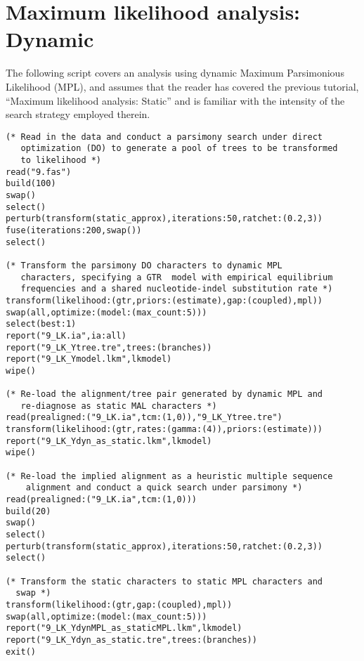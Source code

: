 \section{Maximum likelihood analysis: Dynamic}{\label{tutorial10}}
The following script covers an analysis using dynamic Maximum Parsimonious Likelihood (MPL), and assumes 
that the reader has covered the previous tutorial, ``Maximum likelihood analysis: Static'' and is 
familiar with the intensity of the search strategy employed therein. 
\begin{verbatim}
(* Read in the data and conduct a parsimony search under direct 
   optimization (DO) to generate a pool of trees to be transformed 
   to likelihood *)
read("9.fas")
build(100)
swap()
select()
perturb(transform(static_approx),iterations:50,ratchet:(0.2,3))
fuse(iterations:200,swap())
select()

(* Transform the parsimony DO characters to dynamic MPL
   characters, specifying a GTR  model with empirical equilibrium
   frequencies and a shared nucleotide-indel substitution rate *)
transform(likelihood:(gtr,priors:(estimate),gap:(coupled),mpl))
swap(all,optimize:(model:(max_count:5)))
select(best:1)
report("9_LK.ia",ia:all)
report("9_LK_Ytree.tre",trees:(branches))
report("9_LK_Ymodel.lkm",lkmodel)
wipe()

(* Re-load the alignment/tree pair generated by dynamic MPL and
   re-diagnose as static MAL characters *)
read(prealigned:("9_LK.ia",tcm:(1,0)),"9_LK_Ytree.tre")
transform(likelihood:(gtr,rates:(gamma:(4)),priors:(estimate)))
report("9_LK_Ydyn_as_static.lkm",lkmodel)
wipe()

(* Re-load the implied alignment as a heuristic multiple sequence
    alignment and conduct a quick search under parsimony *)
read(prealigned:("9_LK.ia",tcm:(1,0)))
build(20)
swap()
select()
perturb(transform(static_approx),iterations:50,ratchet:(0.2,3))
select()

(* Transform the static characters to static MPL characters and 
  swap *)
transform(likelihood:(gtr,gap:(coupled),mpl))
swap(all,optimize:(model:(max_count:5)))
report("9_LK_YdynMPL_as_staticMPL.lkm",lkmodel)
report("9_LK_Ydyn_as_static.tre",trees:(branches))
exit()
\end{verbatim}

